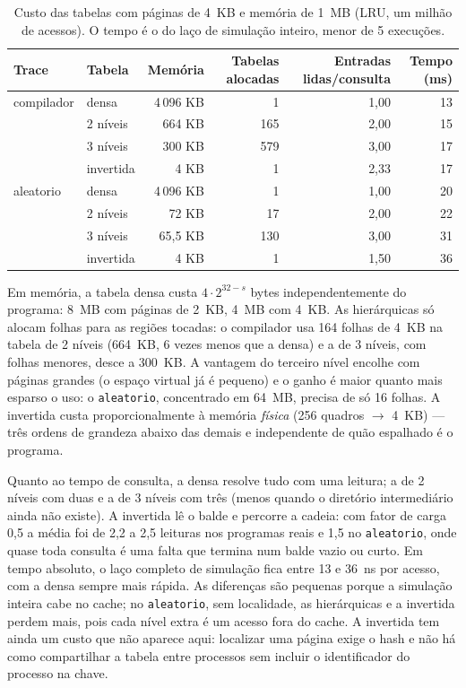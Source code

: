\documentclass[11pt,a4paper]{article}
\begin{document}
\begin{table}[H]
\centering\small
\begin{tabular}{@{}llrrrr@{}}
\toprule
Trace & Tabela & Memória & Tabelas alocadas & Entradas lidas/consulta & Tempo (ms) \\
\midrule
compilador & densa     & 4\,096 KB & 1   & 1,00 & 13 \\
           & 2 níveis  &   664 KB & 165 & 2,00 & 15 \\
           & 3 níveis  &   300 KB & 579 & 3,00 & 17 \\
           & invertida &     4 KB & 1   & 2,33 & 17 \\
\midrule
aleatorio  & densa     & 4\,096 KB & 1   & 1,00 & 20 \\
           & 2 níveis  &    72 KB & 17  & 2,00 & 22 \\
           & 3 níveis  &  65,5 KB & 130 & 3,00 & 31 \\
           & invertida &     4 KB & 1   & 1,50 & 36 \\
\bottomrule
\end{tabular}
\caption{Custo das tabelas com páginas de 4~KB e memória de 1~MB
(LRU, um milhão de acessos). O tempo é o do laço de simulação inteiro,
menor de 5 execuções.}
\label{tab:pt}
\end{table}

Em memória, a tabela densa custa $4 \cdot 2^{32-s}$ bytes
independentemente do programa: 8~MB com páginas de 2~KB, 4~MB com
4~KB. As hierárquicas só alocam folhas para as regiões tocadas: o
compilador usa 164 folhas de 4~KB na tabela de 2 níveis (664~KB, 6
vezes menos que a densa) e a de 3 níveis, com folhas menores, desce a
300~KB. A vantagem do terceiro nível encolhe com páginas grandes (o
espaço virtual já é pequeno) e o ganho é maior quanto mais esparso o
uso: o \texttt{aleatorio}, concentrado em 64~MB, precisa de só 16
folhas. A invertida custa proporcionalmente à memória \emph{física}
(256 quadros $\to$ 4~KB) --- três ordens de grandeza abaixo das demais
e independente de quão espalhado é o programa.

Quanto ao tempo de consulta, a densa resolve tudo com uma leitura; a
de 2 níveis com duas e a de 3 níveis com três (menos quando o
diretório intermediário ainda não existe). A invertida lê o balde e
percorre a cadeia: com fator de carga 0,5 a média foi de 2,2 a 2,5
leituras nos programas reais e 1,5 no \texttt{aleatorio},
onde quase toda consulta é uma falta que termina num balde vazio ou
curto. Em tempo absoluto, o laço completo de simulação fica entre 13 e 36~ns por
acesso, com a densa sempre mais rápida. As diferenças são pequenas
porque a simulação inteira cabe no cache; no \texttt{aleatorio}, sem
localidade, as hierárquicas e a invertida perdem mais, pois cada nível
extra é um acesso fora do cache. A invertida tem ainda um custo que não
aparece aqui: localizar uma página exige o hash e não há como
compartilhar a tabela entre processos sem incluir o identificador do
processo na chave.
\end{document}
